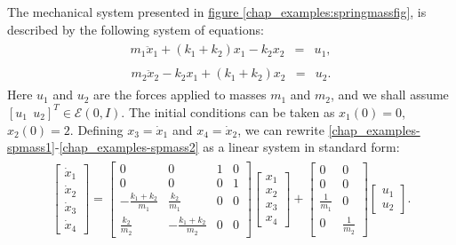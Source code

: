 \documentclass[letterpaper,10pt,english]{sphinxmanual}
\begin{document}
The mechanical system presented in \hyperref[chap_examples:springmassfig]{figure  \ref*{chap_examples:springmassfig}}, is described
by the following system of equations:
\label{chap_examples:equation-spmass1}\begin{gather}
\begin{split}m_1\ddot{x}_1+(k_1+k_2)x_1-k_2x_2 & = & u_1,\end{split}\label{chap_examples-spmass1}
\end{gather}\label{chap_examples:equation-spmass2}\begin{gather}
\begin{split}m_2\ddot{x}_2-k_2x_1+(k_1+k_2)x_2 & = & u_2 .\end{split}\label{chap_examples-spmass2}
\end{gather}
Here $u_1$ and $u_2$ are the forces applied to masses
$m_1$ and $m_2$, and we shall assume
$[u_1 ~~ u_2]^T\in{\mathcal E}(0,I)$. The initial conditions can
be taken as $x_1(0)=0$, $x_2(0)=2$. Defining
$x_3=\dot{x}_1$ and $x_4=\dot{x}_2$, we can rewrite
\eqref{chap_examples-spmass1}-\eqref{chap_examples-spmass2} as a linear system in standard form:
\label{chap_examples:equation-spmassls}\begin{gather}
\begin{split}\left[\begin{array}{c}
\dot{x}_1 \\
\dot{x}_2 \\
\dot{x}_3 \\
\dot{x}_4 \end{array}\right] = \left[\begin{array}{cccc}
0 & 0 & 1 & 0\\
0 & 0 & 0 & 1\\
-\frac{k_1+k_2}{m_1} & \frac{k_2}{m_1} & 0 & 0\\
\frac{k_2}{m_2} & -\frac{k_1+k_2}{m_2} & 0 & 0\end{array}\right]
\left[\begin{array}{c}
x_1 \\
x_2 \\
x_3 \\
x_4 \end{array}\right] + \left[\begin{array}{cc}
0 & 0\\
0 & 0\\
\frac{1}{m_1} & 0\\
0 & \frac{1}{m_2}\end{array}\right]\left[\begin{array}{c}
u_1\\
u_2\end{array}\right].\end{split}\label{chap_examples-spmassls}
\end{gather}
\end{document}
